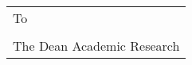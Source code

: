 \begin{table}[hbt!]
\end{table}

\vspace{1cm}
\begin{table}[hbt!]
    \begin{tabular}{l}
        To  \\
        \\
        The Dean Academic Research  
    \end{tabular}
\end{table}
\newpage